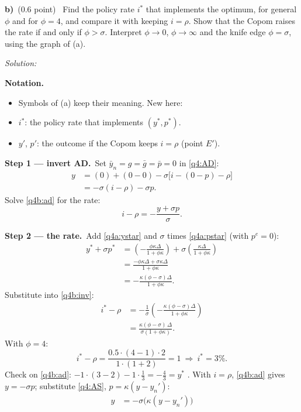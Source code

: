 \documentclass[11pt,a4paper]{article}
\newif\ifsolucoes
\newcommand{\espacoresol}{6cm}
\newcommand{\parte}[2]{\par\Needspace{6\baselineskip}\medskip\noindent\textbf{#1)}~(#2)~}
\newcommand{\resolespaco}{\ifsolucoes\else\par\textit{Solution:}\vspace{\espacoresol}\par\fi}
\newcommand{\passo}[2]{\par\smallskip\noindent\textbf{Step #1.}~#2}
\newenvironment{notacao}{\par\smallskip\noindent\textbf{Notation.}\begin{itemize}[leftmargin=1.4em,topsep=1pt,itemsep=0pt]\small}{\end{itemize}}
\begin{document}
\parte{b}{0.6 point} Find the policy rate $i^*$ that implements the optimum, for general $\phi$ and for $\phi=4$, and
compare it with keeping $i=\rho$. Show that the Copom raises the rate if and only if $\phi>\sigma$. Interpret
$\phi\to0$, $\phi\to\infty$ and the knife edge $\phi=\sigma$, using the graph of (a).
\resolespaco
\begin{sol}
\begin{notacao}
\item Symbols of (a) keep their meaning. New here:
\item $i^*$: the policy rate that implements $(y^*,p^*)$.
\item $y'$, $p'$: the outcome if the Copom keeps $i=\rho$ (point $E'$).
\end{notacao}
\passo{1 --- invert AD}{Set $\bar y_n=g=\bar g=\bar p=0$ in \eqref{q4:AD}:
\begin{align}
y &= (0)+(0-0)-\sigma\big[i-(0-p)-\rho\big]\nonumber\\
&= -\sigma(i-\rho)-\sigma p. \label{q4b:ad}
\end{align}
Solve \eqref{q4b:ad} for the rate:
\begin{equation}
i-\rho=-\frac{y+\sigma p}{\sigma}. \label{q4b:inv}
\end{equation}}
\passo{2 --- the rate}{Add \eqref{q4a:ystar} and $\sigma$ times \eqref{q4a:pstar} (with $p^e=0$):
\begin{align*}
y^*+\sigma p^* &= \left(-\frac{\phi\kappa\Delta}{1+\phi\kappa}\right)+\sigma\left(\frac{\kappa\Delta}{1+\phi\kappa}\right)\\
&= \frac{-\phi\kappa\Delta+\sigma\kappa\Delta}{1+\phi\kappa}\\
&= -\frac{\kappa(\phi-\sigma)\Delta}{1+\phi\kappa}.
\end{align*}
Substitute into \eqref{q4b:inv}:
\begin{align}
i^*-\rho &= -\frac{1}{\sigma}\left(-\frac{\kappa(\phi-\sigma)\Delta}{1+\phi\kappa}\right)\nonumber\\
&= \boxed{\frac{\kappa(\phi-\sigma)\,\Delta}{\sigma(1+\phi\kappa)}}. \label{q4b:istar}
\end{align}
With $\phi=4$:
\[
i^*-\rho=\frac{0.5\cdot(4-1)\cdot2}{1\cdot(1+2)}=1\ \Rightarrow\ \boxed{i^*=3\%}.
\]
Check on \eqref{q4b:ad}: $-1\cdot(3-2)-1\cdot\tfrac13=-\tfrac43=y^*$ \checkmark. With $i=\rho$, \eqref{q4b:ad} gives
$y=-\sigma p$; substitute \eqref{q4:AS}, $p=\kappa(y-y_n')$:
\begin{align*}
y &= -\sigma\big(\kappa(y-y_n')\big)\\

\end{align*}}
\end{sol}
\end{document}
